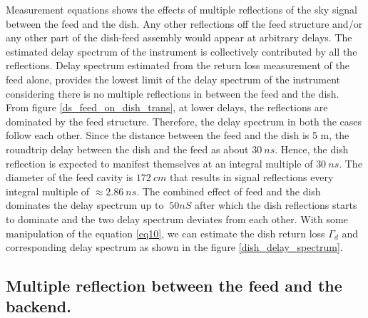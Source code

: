 \documentclass[twocolumn]{emulateapj}
\begin{document}
    Measurement equations shows the effects of multiple reflections of the sky
    signal between the feed and the dish. Any other reflections off the feed
    structure and/or any other part of the dish-feed assembly would appear at
    arbitrary delays. The estimated delay spectrum of the instrument is
    collectively contributed by all the reflections. Delay spectrum estimated from
    the return loss measurement of the feed alone,  provides the lowest limit of
    the delay spectrum of the instrument considering there is no multiple
    reflections in between the feed and the dish.  From figure
    \ref{ds_feed_on_dish_trans}, at lower delays, the reflections are dominated by
    the feed structure. Therefore, the delay spectrum in both the cases follow each
    other. Since the distance between the feed and the dish is 5 m, the roundtrip
    delay between the dish and the feed as about $30~ns$. Hence, the dish
    reflection is expected to manifest themselves at an integral multiple of
    $30~ns$. The diameter of the feed cavity is $172~cm$  that results in signal
    reflections every integral multiple of $\approx2.86~ns$. The combined effect of
    feed and the dish dominates the delay spectrum up to $\> 50nS$ after which the
    dish reflections starts to dominate and the two delay spectrum deviates from
    each other. With some manipulation of the equation \ref{eq10}, we can estimate
    the dish return loss $\Gamma_{d}$ and corresponding delay spectrum as shown in
    the figure \ref{dish_delay_spectrum}.
    
    \subsection{Multiple reflection between the feed and the backend.}
    
\end{document}
